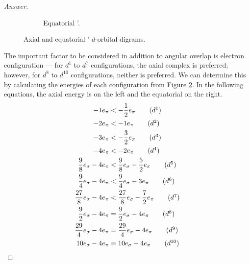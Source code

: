 \documentclass[../psets.tex]{subfiles}
\begin{document}
\begin{enumerate}[label={\Roman*)}]
\begin{enumerate}[label={\textbf{10.\arabic*}}]
\begin{enumerate}[label={\textbf{\alph*.}}]
\begin{proof}[Answer]
\begin{figure}[H]
\begin{subfigure}[b]{0.4\linewidth}
                        \caption{Equatorial '.}
                        \label{fig:orbitalDiagram-ML4La}
                    \end{subfigure}
                    \caption{Axial and equatorial ' $d$-orbital digrams.}
                    \label{fig:orbitalDiagram-ML4L}
                \end{figure}
                The important factor to be considered in addition to angular overlap is electron configuration --- for $d^1$ to $d^7$ configurations, the axial complex is preferred; however, for $d^8$ to $d^{10}$ configurations, neither is preferred. We can determine this by calculating the energies of each configuration from Figure \ref{fig:orbitalDiagram-ML4L}. In the following equations, the axial energy is on the left and the equatorial on the right.
                \begin{align*}
                    -1e_\pi &< -\frac{1}{2}e_\pi\tag{$d^1$}\\
                    -2e_\pi &< -1e_\pi\tag{$d^2$}\\
                    -3e_\pi &< -\frac{3}{2}e_\pi\tag{$d^3$}\\
                    -4e_\pi &< -2e_\pi\tag{$d^4$}\\
                    \frac{9}{8}e_\sigma-4e_\pi &< \frac{9}{8}e_\sigma-\frac{5}{2}e_\pi\tag{$d^5$}\\
                    \frac{9}{4}e_\sigma-4e_\pi &< \frac{9}{4}e_\sigma-3e_\pi\tag{$d^6$}\\
                    \frac{27}{8}e_\sigma-4e_\pi &< \frac{27}{8}e_\sigma-\frac{7}{2}e_\pi\tag{$d^7$}\\
                    \frac{9}{2}e_\sigma-4e_\pi &= \frac{9}{2}e_\sigma-4e_\pi\tag{$d^8$}\\
                    \frac{29}{4}e_\sigma-4e_\pi &= \frac{29}{4}e_\sigma-4e_\pi\tag{$d^9$}\\
                    10e_\sigma-4e_\pi &= 10e_\sigma-4e_\pi\tag{$d^{10}$}\\
                \end{align*}
            \end{proof}

\end{enumerate}
\end{enumerate}
\end{enumerate}
\end{document}
